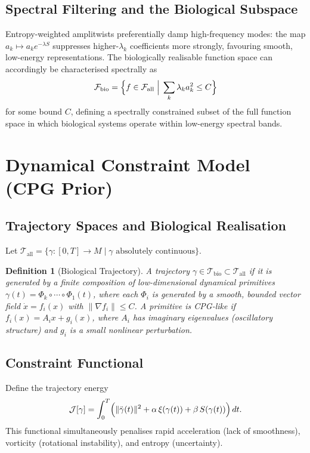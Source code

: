 \documentclass[12pt, a4paper]{article}
\newtheorem{definition}[theorem]{Definition}
\theoremstyle{remark}
\theoremstyle{definition}
\begin{document}
\subsection{Spectral Filtering and the Biological Subspace}

Entropy-weighted amplitwists preferentially damp high-frequency modes: the map
$a_k \mapsto a_k e^{-\lambda S}$ suppresses higher-$\lambda_k$ coefficients more
strongly, favouring smooth, low-energy representations.  The biologically realisable
function space can accordingly be characterised spectrally as
\[
\mathcal{F}_{\mathrm{bio}}
= \Bigl\{f \in \mathcal{F}_{\mathrm{all}} \;\Big|\; \sum_k \lambda_k a_k^2 \le C\Bigr\}
\]
for some bound $C$, defining a spectrally constrained subset of the full function space in
which biological systems operate within low-energy spectral bands.

\section{Dynamical Constraint Model (CPG Prior)}
\label{app:cpg}

\subsection{Trajectory Spaces and Biological Realisation}

Let $\mathcal{T}_{\mathrm{all}} = \{\gamma\colon [0,T] \to M \mid \gamma \text{ absolutely
continuous}\}$.

\begin{definition}[Biological Trajectory]
A trajectory $\gamma \in \mathcal{T}_{\mathrm{bio}} \subset \mathcal{T}_{\mathrm{all}}$
if it is generated by a finite composition of low-dimensional dynamical primitives
$\gamma(t) = \Phi_k \circ \cdots \circ \Phi_1(t)$, where each $\Phi_i$ is generated by
a smooth, bounded vector field $\dot{x} = f_i(x)$ with $\|\nabla f_i\| \le C$.
A primitive is \emph{CPG-like} if $f_i(x) = A_i x + g_i(x)$, where $A_i$ has imaginary
eigenvalues (oscillatory structure) and $g_i$ is a small nonlinear perturbation.
\end{definition}

\subsection{Constraint Functional}

Define the trajectory energy
\[
\mathcal{J}[\gamma]
= \int_0^T \Bigl(
\|\ddot{\gamma}(t)\|^2
+ \alpha\,\xi(\gamma(t))
+ \beta\,S(\gamma(t))
\Bigr)\,dt.
\]
This functional simultaneously penalises rapid acceleration (lack of smoothness), vorticity
(rotational instability), and entropy (uncertainty).
\end{document}
